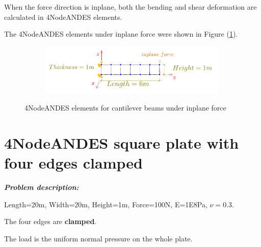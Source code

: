 \documentclass[fleqn,11pt,letter]{article}
\begin{document}
When the force direction is inplane, both the bending and shear deformation are calculated in 4NodeANDES elements. 

The 4NodeANDES elements under inplane force were shown in Figure (\ref{fig 4NodeANDES elements for cantilever beams under inplane force}).

\begin{figure}[H]
  \centering
  \vskip 8pt
  \begin{subfigure}{0.5\textwidth}
    \centering
    \includegraphics[width=9cm]{../Figure_files/4NodeANDES/beam_ANDES_yz_inPlane_6div.pdf}
  \end{subfigure}
  \captionsetup{justification=centering,margin=3cm}
  \caption{4NodeANDES elements for cantilever beams under inplane force}
  \label{fig 4NodeANDES elements for cantilever beams under inplane force}
\end{figure}




















\newpage
\section{4NodeANDES square plate with four edges clamped}



\emph{\textbf{Problem description:}}



Length=20m, Width=20m, Height=1m, Force=100N, E=1E8Pa, $\nu=0.3$. 

The four edges are \textbf{clamped}. 

The load is the uniform normal pressure on the whole plate. 
\end{document}
